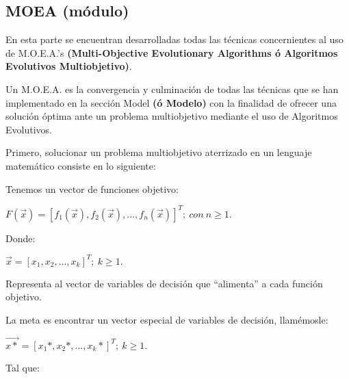 \documentclass[letterpaper,10pt,english]{sphinxmanual}
\begin{document}
\subsection{MOEA (módulo)}
\label{Model/MOEA/MOEA::doc}\label{Model/MOEA/MOEA:moea-modulo}
\begin{DUlineblock}{0em}
\item[] En esta parte se encuentran desarrolladas todas las técnicas
concernientes al uso de M.O.E.A.'s \textbf{(Multi-Objective Evolutionary Algorithms
ó Algoritmos Evolutivos Multiobjetivo)}.
\item[] 
\item[] Un M.O.E.A. es la convergencia y culminación de todas las técnicas que se
han implementado en la sección Model \textbf{(ó Modelo)} con la finalidad de
ofrecer una solución óptima ante un problema multiobjetivo mediante el
uso de Algoritmos Evolutivos.
\item[] 
\item[] Primero, solucionar un problema multiobjetivo aterrizado en un lenguaje matemático consiste en lo siguiente:
\item[] Tenemos un vector de funciones objetivo:
\end{DUlineblock}

\begin{center}\(F(\vec{x}) = [f_1(\vec{x}),f_2(\vec{x}),...,f_n(\vec{x})]^T;\ con\ n \geqslant 1.\)
\end{center}
\begin{DUlineblock}{0em}
\item[] Donde:
\end{DUlineblock}

\begin{center}\(\vec{x} = [x_1,x_2,...,x_k]^T;\ k \geqslant 1.\)
\end{center}
\begin{DUlineblock}{0em}
\item[] Representa al vector de variables de decisión que ``alimenta'' a cada función objetivo.
\item[] La meta es encontrar un vector especial de variables de decisión, llamémosle:
\end{DUlineblock}

\begin{center}\(\vec{x*} = [x_1*,x_2*,...,x_k*]^T;\ k \geqslant 1.\)
\end{center}
\begin{DUlineblock}{0em}
\item[] Tal que:
\end{DUlineblock}
\end{document}
